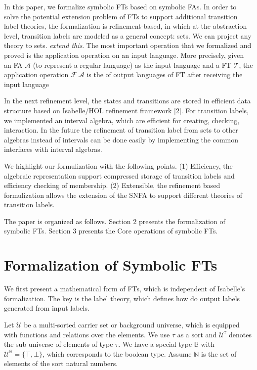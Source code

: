 \documentclass[a4paper,UKenglish,cleveref, autoref, thm-restate]{lipics-v2021}
\begin{document}
In this paper, we formalize symbolic FTs based on symbolic FAs. In order to solve the potential extension problem of FTs to support additional transition label theories, the formalization is refinement-based, in which at the abstraction level, transition labels are modeled as a general concept: sets. We can project any theory to sets. \emph{extend this}.
The most important operation that we formalized and proved is the application operation on an input language.  More precisely, given an FA $\mathcal{A}$ (to represent a regular language) as the input language and a FT $\mathcal{T}$, the application operation $\mathcal{F}~\mathcal{A}$ is the  of output languages of FT after receiving the input language 

In the next refinement level, the states and transitions are stored in efficient data structure based on Isabelle/HOL refinement framework [2].
For transition labels, we implemented an interval algebra, which are efficient for creating, checking, interaction.
%
In the future the refinement of transition label from sets to other algebras instead of intervals can be done easily by implementing the common interfaces with interval algebras.

We highlight our formulization with the following points.
(1) Efficiency, the algebraic representation
support compressed storage of transition labels and efficiency checking
of membership.
(2) Extensible, the refinement based formulization allows the extension
of the SNFA to support different theories of transition labels.

The paper is organized as follows.
Section 2 presents the formalization of symbolic FTs.
Section 3 presents the Core operations of symbolic FTs.





\section{Formalization of Symbolic FTs}


We first present a mathematical form of FTs, which is independent of Isabelle's formalization. 
The key is the label theory, which defines how do output labels generated from input labels.

Let $\mathcal{U}$ be a multi-sorted carrier set or background universe, which is equipped with functions and relations over the elements. We use $\tau$ as a sort and $\mathcal{U}^\tau$ denotes the sub-universe of elements of type $\tau$. 
We have a special type $\mathbb{B}$ with $\mathcal{U}^\mathbb{B} = \{ \top, \bot\}$, which corresponds to the boolean type. Assume $\mathbb{N}$ is the set of elements of the sort natural numbers.
\end{document}
